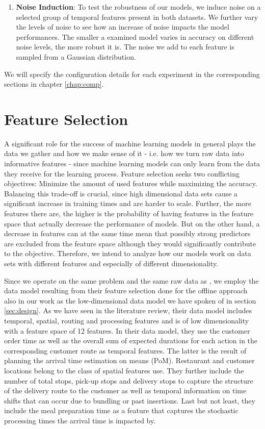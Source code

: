 \begin{enumerate}
	\item \textbf{Noise Induction}: To test the robustness of our models, we induce noise on a selected group of temporal features present in both datasets. We further vary the levels of noise to see how an increase of noise impacts the model performances. The smaller a examined model varies in accuracy on different noise levels, the more robust it is. The noise we add to each feature is sampled from a Gaussian distribution. 
\end{enumerate}
We will specify the configuration details for each experiment in the corresponding sections in chapter \ref{chap:comp}. 

\section{Feature Selection}\label{sec:fs}

A significant role for the success of machine learning models in general plays the data we gather and how we make sense of it - i.e. how we turn raw data into informative features - since machine learning models can only learn from the data they receive for the learning process. Feature selection seeks two conflicting objectives: Minimize the amount of used features while maximizing the accuracy. Balancing this trade-off is crucial, since high dimensional data sets cause a significant increase in training times and are harder to scale. Further, the more features there are, the higher is the probability of having features in the feature space that actually decrease the performance of models. But on the other hand, a decrease in features can at the same time mean that possibly strong predictors are excluded from the feature space although they would significantly contribute to the objective.  Therefore, we intend to analyze how our models work on data sets with different features and especially of different dimensionality.   

Since we operate on the same problem and the same raw data as \cite{Hildebrandt2020_EAT}, we employ the data model resulting from their feature selection done for the offline approach also in our work as the low-dimensional data model we have spoken of in section \ref{sec:design}. As we have seen in the literature review, their data model includes temporal, spatial, routing and processing features and is of low dimensionality with a feature space of 12 features.
In their data model, they use the customer order time as well as the overall sum of expected durations for each action in the corresponding customer route as temporal features. The latter is the result of planning the arrival time estimation on means (PoM). Restaurant and customer locations belong to the class of spatial features \cite{Hildebrandt2020_EAT} use. They further include the number of total stops, pick-up stops and delivery stops to capture the structure of the delivery route to the customer as well as temporal information on time shifts that can occur due to bundling or past insertions. Last but not least, they include the meal preparation time as a feature that captures the stochastic processing times the arrival time is impacted by.


